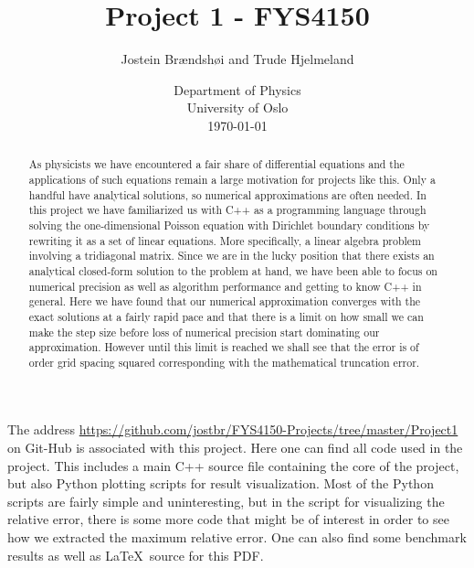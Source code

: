 \documentclass[12pt]{article}
\numberwithin{figure}{section}
\numberwithin{table}{section}
\begin{document}
\begin{titlepage}
\title{Project 1 - FYS4150}
\author{Jostein Brændshøi and Trude Hjelmeland}
\date{%
    Department of Physics\\%
    University of Oslo\\[2ex]%
    \today
}
\clearpage
\maketitle
\thispagestyle{empty}

\begin{abstract}
\noindent As physicists we have encountered a fair share of differential equations and the applications of such equations remain a large motivation for projects like this. Only a handful have analytical solutions, so numerical approximations are often needed. In this project we have familiarized us with C++ as a programming language through solving the one-dimensional Poisson equation with Dirichlet boundary conditions by rewriting it as a set of linear equations. More specifically, a linear algebra problem involving a tridiagonal matrix. Since we are in the lucky position that there exists an analytical closed-form solution to the problem at hand, we have been able to focus on numerical precision as well as algorithm performance and getting to know C++ in general. Here we have found that our numerical approximation converges with the exact solutions at a fairly rapid pace and that there is a limit on how small we can make the step size before loss of numerical precision start dominating our approximation. However until this limit is reached we shall see that the error is of order grid spacing squared corresponding with the mathematical truncation error.
\end{abstract}
\vspace{2.00cm}

\noindent The address \url{https://github.com/jostbr/FYS4150-Projects/tree/master/Project1} on Git-Hub is associated with this project. Here one can find all code used in the project. This includes a main C++ source file containing the core of the project, but also Python plotting scripts for result visualization. Most of the Python scripts are fairly simple and uninteresting, but in the script for visualizing the relative error, there is some more code that might be of interest in order to see how we extracted the maximum relative error. One can also find some benchmark results as well as \LaTeX \ source for this PDF.

\end{titlepage}
\pagebreak
\end{document}
